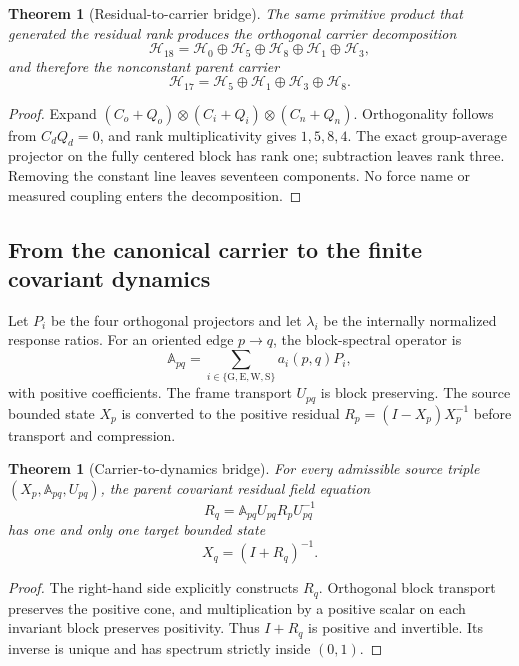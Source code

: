 \documentclass[11pt]{article}
\numberwithin{equation}{section}
\newtheorem{theorem}[definition]{Theorem}
\theoremstyle{remark}
\begin{document}
\begin{theorem}[Residual-to-carrier bridge]
The same primitive product that generated the residual rank produces the orthogonal carrier decomposition
\begin{equation}
\mathcal H_{18}=\mathcal H_0\oplus\mathcal H_5\oplus\mathcal H_8\oplus\mathcal H_1\oplus\mathcal H_3,
\end{equation}
and therefore the nonconstant parent carrier
\begin{equation}
\mathcal H_{17}=\mathcal H_5\oplus\mathcal H_1\oplus\mathcal H_3\oplus\mathcal H_8.
\end{equation}
\end{theorem}
\begin{proof}
Expand $(C_o+Q_o)\otimes(C_i+Q_i)\otimes(C_n+Q_n)$. Orthogonality follows from $C_dQ_d=0$, and rank multiplicativity gives $1,5,8,4$. The exact group-average projector on the fully centered block has rank one; subtraction leaves rank three. Removing the constant line leaves seventeen components. No force name or measured coupling enters the decomposition.
\end{proof}

\subsection{From the canonical carrier to the finite covariant dynamics}
Let $P_i$ be the four orthogonal projectors and let $\lambda_i$ be the internally normalized response ratios. For an oriented edge $p\to q$, the block-spectral operator is
\begin{equation}
\mathbb A_{pq}=\sum_{i\in\{\mathrm G,\mathrm E,\mathrm W,\mathrm S\}}a_i(p,q)P_i,
\end{equation}
with positive coefficients. The frame transport $U_{pq}$ is block preserving. The source bounded state $X_p$ is converted to the positive residual $R_p=(I-X_p)X_p^{-1}$ before transport and compression.

\begin{theorem}[Carrier-to-dynamics bridge]
For every admissible source triple $(X_p,\mathbb A_{pq},U_{pq})$, the parent covariant residual field equation
\begin{equation}
R_q=\mathbb A_{pq}U_{pq}R_pU_{pq}^{-1}
\end{equation}
has one and only one target bounded state
\begin{equation}
X_q=(I+R_q)^{-1}.
\end{equation}
\end{theorem}
\begin{proof}
The right-hand side explicitly constructs $R_q$. Orthogonal block transport preserves the positive cone, and multiplication by a positive scalar on each invariant block preserves positivity. Thus $I+R_q$ is positive and invertible. Its inverse is unique and has spectrum strictly inside $(0,1)$.
\end{proof}
\end{document}
